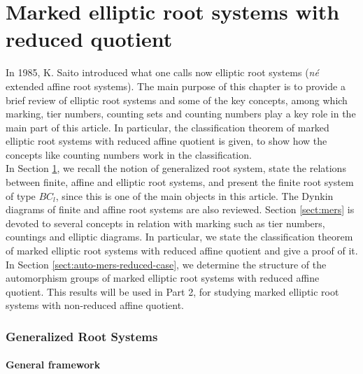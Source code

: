\documentclass[11pt]{amsart}
\newcommand{\R}{\mathbb{R}}
\begin{document}
 

\part{Marked elliptic root systems with reduced quotient}\label{chapter:review}

 In 1985, K. Saito \cite{Saito1985} introduced what one calls now elliptic root systems (\textit{n\'{e}} extended affine root systems). 
  The main purpose of this chapter is to provide a brief review of elliptic root systems and some of the key concepts,  among which marking, tier numbers, counting sets and counting numbers play a key role in the main part of this article. In particular, the classification theorem of marked elliptic root systems with reduced affine quotient is given, to show how the concepts like counting numbers work in the classification. \\
  
  In Section \ref{sect:general}, we recall the notion of generalized root system, state the relations between finite, affine and elliptic root systems, and present the finite root system of type $BC_l$, since this is one of the main objects in this article.  The Dynkin diagrams of finite and affine root systems are also reviewed. Section \ref{sect:mers} is devoted to several concepts in relation with marking such as tier numbers, countings and elliptic diagrams. In particular, we state the classification theorem of marked elliptic root systems with reduced affine quotient and give a proof of it. 
In Section  \ref{sect:auto-mers-reduced-case}, we {determine 
the structure of the automorphism groups of marked elliptic root systems with reduced 
affine quotient. This results will be used in Part 2, for studying marked elliptic root 
systems with non-reduced affine quotient. }


  
 




\section{Generalized Root Systems}\label{sect:general}

\subsection{General framework}\label{subsec:general}
\end{document}
